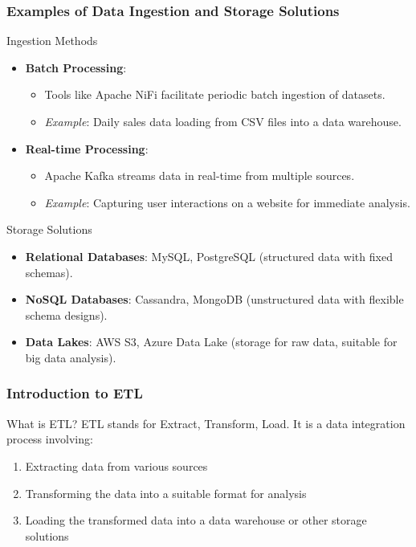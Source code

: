 \documentclass[aspectratio=169]{beamer}
\begin{document}
\begin{frame}[fragile]
    \frametitle{Examples of Data Ingestion and Storage Solutions}
    \begin{block}{Ingestion Methods}
        \begin{itemize}
            \item \textbf{Batch Processing}:
                \begin{itemize}
                    \item Tools like Apache NiFi facilitate periodic batch ingestion of datasets.
                    \item \textit{Example}: Daily sales data loading from CSV files into a data warehouse.
                \end{itemize}
            
            \item \textbf{Real-time Processing}:
                \begin{itemize}
                    \item Apache Kafka streams data in real-time from multiple sources.
                    \item \textit{Example}: Capturing user interactions on a website for immediate analysis.
                \end{itemize}
        \end{itemize}
    \end{block}

    \begin{block}{Storage Solutions}
        \begin{itemize}
            \item \textbf{Relational Databases}: MySQL, PostgreSQL (structured data with fixed schemas).
            \item \textbf{NoSQL Databases}: Cassandra, MongoDB (unstructured data with flexible schema designs).
            \item \textbf{Data Lakes}: AWS S3, Azure Data Lake (storage for raw data, suitable for big data analysis).
        \end{itemize}
    \end{block}
\end{frame}

\begin{frame}[fragile]
    \frametitle{Introduction to ETL}
    \begin{block}{What is ETL?}
        ETL stands for Extract, Transform, Load. It is a data integration process involving:
        \begin{enumerate}
            \item Extracting data from various sources
            \item Transforming the data into a suitable format for analysis
            \item Loading the transformed data into a data warehouse or other storage solutions
        \end{enumerate}
    \end{block}
\end{frame}
\end{document}
